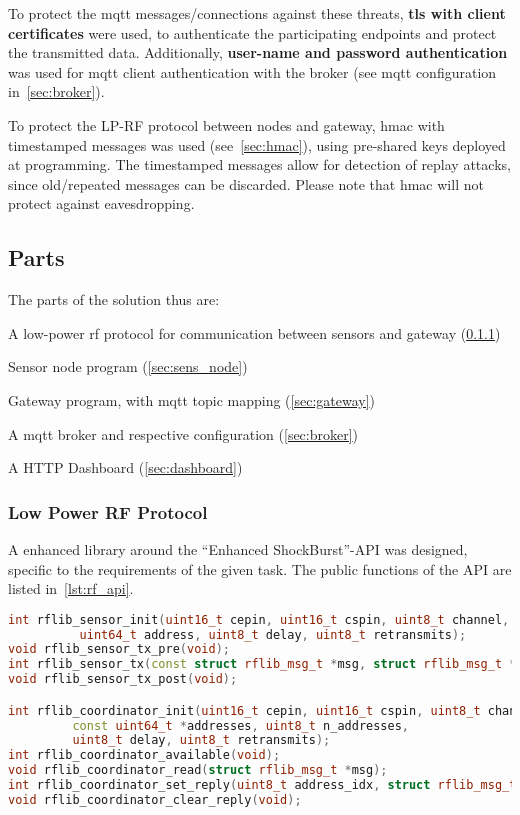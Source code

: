 To protect the \gls{mqtt} messages/connections against these threats, \textbf{\gls{tls} with client certificates} were used, to authenticate the participating endpoints and protect the transmitted data. Additionally, \textbf{user-name and password authentication} was used for \gls{mqtt} client authentication with the broker (see \gls{mqtt} configuration in~\cref{sec:broker}).

To protect the LP-RF protocol between nodes and gateway, \gls{hmac} with timestamped messages was used (see~\cref{sec:hmac}), using pre-shared keys deployed at programming. The timestamped messages allow for detection of replay attacks, since old/repeated messages can be discarded. Please note that \gls{hmac} will not protect against eavesdropping.


\subsection{Parts}

The parts of the solution thus are:

\begin{compactitem}
  \item A low-power \gls{rf} protocol for communication between sensors and gateway (\cref{sec:rf_proto})
  \item Sensor node program (\cref{sec:sens_node})
  \item Gateway program, with \gls{mqtt} topic mapping (\cref{sec:gateway})
  \item A \gls{mqtt} broker and respective configuration (\cref{sec:broker})
  \item A HTTP Dashboard (\cref{sec:dashboard})
\end{compactitem}


\subsubsection{Low Power RF Protocol}
\label{sec:rf_proto}

A enhanced library around the ``Enhanced ShockBurst''-API was designed, specific to the requirements of the given task. The public functions of the API are listed in~\cref{lst:rf_api}.

\begin{lstlisting}[language=C++,label=lst:rf_api,caption="RF Wrapper Library API"]
int rflib_sensor_init(uint16_t cepin, uint16_t cspin, uint8_t channel,
          uint64_t address, uint8_t delay, uint8_t retransmits);
void rflib_sensor_tx_pre(void);
int rflib_sensor_tx(const struct rflib_msg_t *msg, struct rflib_msg_t *ackmsg);
void rflib_sensor_tx_post(void);

int rflib_coordinator_init(uint16_t cepin, uint16_t cspin, uint8_t channel,
         const uint64_t *addresses, uint8_t n_addresses,
         uint8_t delay, uint8_t retransmits);
int rflib_coordinator_available(void);
void rflib_coordinator_read(struct rflib_msg_t *msg);
int rflib_coordinator_set_reply(uint8_t address_idx, struct rflib_msg_t *msg);
void rflib_coordinator_clear_reply(void);
\end{lstlisting}


